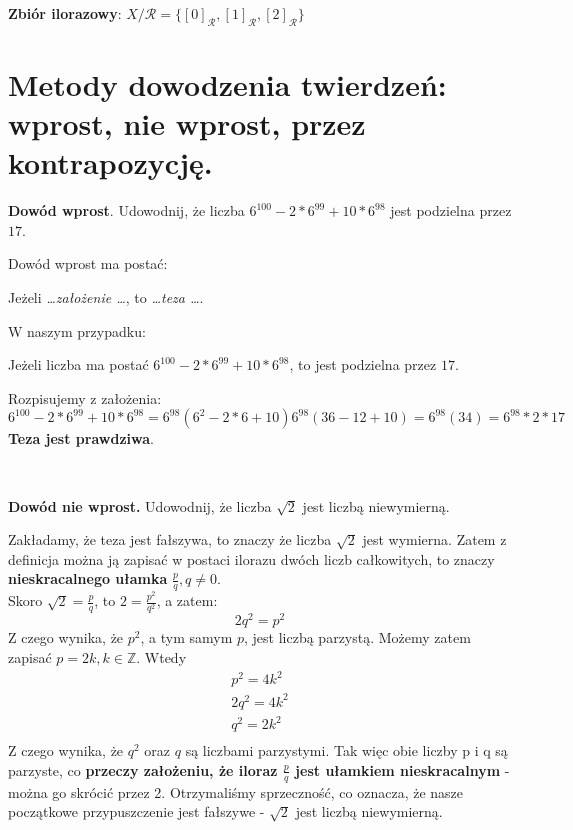 \documentclass[12pt]{article}
\begin{document}
    \textbf{Zbiór ilorazowy}: $X/\mathcal{R} = \{[0]_{\mathcal{R}}, [1]_{\mathcal{R}}, [2]_{\mathcal{R}}\}$


    \newpage

    \section{Metody dowodzenia twierdzeń: wprost, nie wprost, przez kontrapozycję.}

    \begin{exercise}
        \textbf{Dowód wprost}. Udowodnij, że liczba $6^{100} - 2*6^{99} + 10*6^{98}$ jest podzielna przez $17$.
    \end{exercise}

    \noindent Dowód wprost ma postać:
    \begin{center}
        Jeżeli \textit{\ldots założenie \ldots}, to \textit{\ldots teza \ldots}.
    \end{center}

    \noindent W naszym przypadku:
    \begin{center}
        Jeżeli liczba ma postać $6^{100} - 2*6^{99} + 10*6^{98}$, to jest podzielna przez $17$.
    \end{center}

    \noindent Rozpisujemy z założenia:
    \[6^{100} - 2*6^{99} + 10*6^{98} = 6^{98}(6^2 - 2*6 + 10) 6^{98}(36 - 12 + 10) = 6^{98}(34) = 6^{98}*2*17\]
    \textbf{Teza jest prawdziwa}.

    \hfill \\

    \begin{exercise}
        \textbf{Dowód nie wprost.} Udowodnij, że liczba $\sqrt{2}$ jest liczbą niewymierną.
    \end{exercise}

   \noindent Zakładamy, że teza jest fałszywa, to znaczy że liczba $\sqrt{2}$ jest wymierna. Zatem z definicja można ją zapisać
    w postaci ilorazu dwóch liczb całkowitych, to znaczy \textbf{nieskracalnego ułamka} $\frac{p}{q}, q \neq 0$.\\

    Skoro $\sqrt{2} = \frac{p}{q}$, to $2 = \frac{p^2}{q^2}$, a zatem:
    \[ 2q^2 = p^2\]
    Z czego wynika, że $p^2$, a tym samym $p$, jest liczbą parzystą. Możemy zatem zapisać $p = 2k, k \in \mathbb{Z}$.
    Wtedy
    \begin{gather*}
        p^2 = 4k^2\\
        2q^2 = 4k^2\\
        q^2 = 2k^2\\
    \end{gather*}
    Z czego wynika, że $q^2$ oraz $q$ są liczbami parzystymi. Tak więc obie liczby p i q są parzyste, co \textbf{przeczy
    założeniu, że iloraz $\frac{p}{q}$ jest ułamkiem nieskracalnym} - można go skrócić przez 2. Otrzymaliśmy sprzeczność,
    co oznacza, że nasze początkowe przypuszczenie jest fałszywe -  $\sqrt{2}$ jest liczbą niewymierną.
\end{document}
